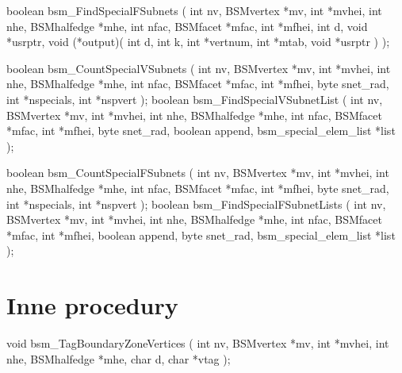 \begin{listingC}
boolean bsm_FindSpecialFSubnets ( int nv, BSMvertex *mv, int *mvhei,
                          int nhe, BSMhalfedge *mhe,
                          int nfac, BSMfacet *mfac, int *mfhei,
                          int d, void *usrptr,
                          void (*output)( int d, int k, int *vertnum,
                                          int *mtab, void *usrptr ) );
\end{listingC}

\begin{listingC}
boolean bsm_CountSpecialVSubnets ( int nv, BSMvertex *mv, int *mvhei,
                                   int nhe, BSMhalfedge *mhe,
                                   int nfac, BSMfacet *mfac, int *mfhei,
                                   byte snet_rad,
                                   int *nspecials, int *nspvert );
boolean bsm_FindSpecialVSubnetList (
                               int nv, BSMvertex *mv, int *mvhei,
                               int nhe, BSMhalfedge *mhe,
                               int nfac, BSMfacet *mfac, int *mfhei,
                               byte snet_rad,
                               boolean append,
                               bsm_special_elem_list *list );
\end{listingC}

\begin{listingC}
boolean bsm_CountSpecialFSubnets ( int nv, BSMvertex *mv, int *mvhei,
                                   int nhe, BSMhalfedge *mhe,
                                   int nfac, BSMfacet *mfac, int *mfhei,
                                   byte snet_rad,
                                   int *nspecials, int *nspvert );
boolean bsm_FindSpecialFSubnetLists (
                                int nv, BSMvertex *mv, int *mvhei,
                                int nhe, BSMhalfedge *mhe,
                                int nfac, BSMfacet *mfac, int *mfhei,
                                boolean append,
                                byte snet_rad, 
                                bsm_special_elem_list *list );
\end{listingC}


\section{Inne procedury}

\begin{listingC}
void bsm_TagBoundaryZoneVertices ( int nv, BSMvertex *mv, int *mvhei,
                                   int nhe, BSMhalfedge *mhe,
                                   char d, char *vtag );
\end{listingC}

